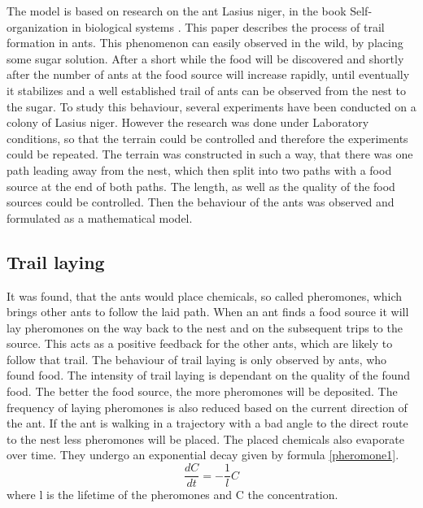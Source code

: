 The model is based on research on the ant Lasius niger, in the book Self-organization in biological systems \citep{camazine2003}. This paper describes the process of trail formation in ants. This phenomenon can easily observed in the wild, by placing some sugar solution. After a short while the food will be discovered and shortly after the number of ants at the food source will increase rapidly, until eventually it stabilizes and a well established trail of ants can be observed from the nest to the sugar. To study this behaviour, several experiments have been conducted on a colony of Lasius niger. However the research was done under Laboratory conditions, so that the terrain could be controlled and therefore the experiments could be repeated. The terrain was constructed in such a way, that there was one path leading away from the nest, which then split into two paths with a food source at the end of both paths. The length, as well as the quality of the food sources could be controlled. Then the behaviour of the ants was observed and formulated as a mathematical model.
\subsection{Trail laying}
 It was found, that the ants would place chemicals, so called pheromones, which brings other ants to follow the laid path. When an ant finds a food source it will lay pheromones on the way back to the nest and on the subsequent trips to the source. This acts as a positive feedback for the other ants, which are likely to follow that trail. The behaviour of trail laying is only observed by ants, who found food. The intensity of trail laying is dependant on the quality of the found food. The better the food source, the more pheromones will be deposited. The frequency of laying pheromones is also reduced based on the current direction of the ant. If the ant is walking in a trajectory with a bad angle to the direct route to the nest less pheromones will be placed. The placed chemicals also evaporate over time. They undergo an exponential decay given by formula \ref{pheromone1}.
 \begin{equation} \label{pheromone1}
  \frac{dC}{dt}=-\frac{1}{l}C
 \end{equation}
 where l is the lifetime of the pheromones and C the concentration.
